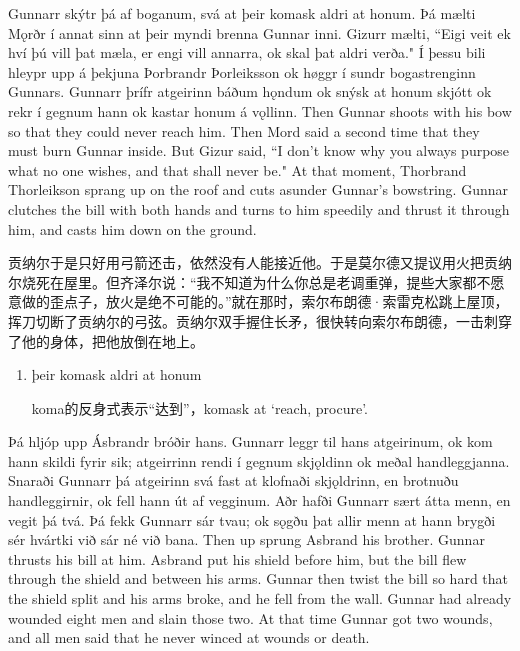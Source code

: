 \begin{paracol}{2}
  Gunnarr skýtr þá af boganum, svá at þeir komask aldri at honum. Þá mælti Mǫrðr í annat sinn at þeir myndi brenna Gunnar inni. Gizurr mælti, ``Eigi veit ek hví þú vill þat mæla, er engi vill annarra, ok skal þat aldri verða." Í þessu bili hleypr upp á þekjuna Þorbrandr Þorleiksson ok høggr í sundr bogastrenginn Gunnars. Gunnarr þrífr atgeirinn báðum hǫndum ok snýsk at honum skjótt ok rekr í gegnum hann ok kastar honum á vǫllinn.
  \switchcolumn
  Then Gunnar shoots with his bow so that they could never reach him. Then Mord said a second time that they must burn Gunnar inside. But Gizur said, ``I don't know why you always purpose what no one wishes, and that shall never be." At that moment, Thorbrand Thorleikson sprang up on the roof and cuts asunder Gunnar's bowstring. Gunnar clutches the bill with both hands and turns to him speedily and thrust it through him, and casts him down on the ground.
\end{paracol}
\begin{translation*}{}
  贡纳尔于是只好用弓箭还击，依然没有人能接近他。于是莫尔德又提议用火把贡纳尔烧死在屋里。但齐泽尔说：“我不知道为什么你总是老调重弹，提些大家都不愿意做的歪点子，放火是绝不可能的。”就在那时，索尔布朗德·索雷克松跳上屋顶，挥刀切断了贡纳尔的弓弦。贡纳尔双手握住长矛，很快转向索尔布朗德，一击刺穿了他的身体，把他放倒在地上。
\end{translation*}
\begin{grammar*}{}
  \begin{enumerate}[leftmargin=*]
    \item þeir komask aldri at honum

          koma的反身式表示“达到”，komask at `reach, procure'.
  \end{enumerate}
\end{grammar*}
\begin{paracol}{2}
  Þá hljóp upp Ásbrandr bróðir hans. Gunnarr leggr til hans atgeirinum, ok kom hann skildi fyrir sik; atgeirrinn rendi í gegnum skjǫldinn ok meðal handleggjanna. Snaraði Gunnarr þá atgeirinn svá fast at klofnaði skjǫldrinn, en brotnuðu handleggirnir, ok fell hann út af vegginum. Aðr hafði Gunnarr sært átta menn, en vegit þá tvá. Þá fekk Gunnarr sár tvau; ok sǫgðu þat allir menn at hann brygði sér hvártki við sár né við bana.
  \switchcolumn
  Then up sprung Asbrand his brother. Gunnar thrusts his bill at him. Asbrand put his shield before him, but the bill flew through the shield and between his arms. Gunnar then twist the bill so hard that the shield split and his arms broke, and he fell from the wall. Gunnar had already wounded eight men and slain those two. At that time Gunnar got two wounds, and all men said that he never winced at wounds or death.
\end{paracol}
